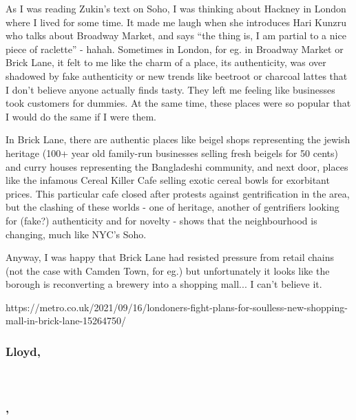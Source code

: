 \documentclass{article}
\begin{document}
As I was reading Zukin's text on Soho, I was thinking about Hackney in London where I lived for some time. It made me laugh when she introduces Hari Kunzru who talks about Broadway Market, and says ``the thing is, I am partial to a nice piece of raclette'' - hahah. 
Sometimes in London, for eg. in Broadway Market or Brick Lane, it felt to me like the charm of a place, its authenticity, was over shadowed by fake authenticity or new trends like beetroot or charcoal lattes that I don't believe anyone actually finds tasty. They left me feeling like businesses took customers for dummies. At the same time, these places were so popular that I would do the same if I were them.

In Brick Lane, there are authentic places like beigel shops representing the jewish heritage (100+ year old family-run businesses selling fresh beigels for 50 cents) and curry houses representing the Bangladeshi community, and next door, places like the infamous Cereal Killer Cafe selling exotic cereal bowls for exorbitant prices. This particular cafe closed after protests against gentrification in the area, but the clashing of these worlds - one of heritage, another of gentrifiers looking for (fake?) authenticity and for novelty - shows that the neighbourhood is changing, much like NYC's Soho.

Anyway, I was happy that Brick Lane had resisted pressure from retail chains (not the case with Camden Town, for eg.) but unfortunately it looks like the borough is reconverting a brewery into a shopping mall... I can't believe it.

https://metro.co.uk/2021/09/16/londoners-fight-plans-for-soulless-new-shopping-mall-in-brick-lane-15264750/ 

\subsubsection{Lloyd, \textit{}}

\begin{outline}
	\1
\end{outline}

\



\subsubsection{, \textit{}}

\begin{outline}
	\1
\end{outline}

\fi
\end{document}
